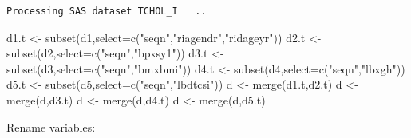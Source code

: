 \documentclass[
  letterpaper,
  DIV=11,
  numbers=noendperiod]{scrartcl}
\newenvironment{Shaded}{\begin{snugshade}}{\end{snugshade}}
\newcommand{\AttributeTok}[1]{\textcolor[rgb]{0.40,0.45,0.13}{#1}}
\newcommand{\CommentTok}[1]{\textcolor[rgb]{0.37,0.37,0.37}{#1}}
\newcommand{\FunctionTok}[1]{\textcolor[rgb]{0.28,0.35,0.67}{#1}}
\newcommand{\NormalTok}[1]{\textcolor[rgb]{0.00,0.23,0.31}{#1}}
\newcommand{\OtherTok}[1]{\textcolor[rgb]{0.00,0.23,0.31}{#1}}
\newcommand{\SpecialCharTok}[1]{\textcolor[rgb]{0.37,0.37,0.37}{#1}}
\newcommand{\StringTok}[1]{\textcolor[rgb]{0.13,0.47,0.30}{#1}}
\begin{document}
\begin{verbatim}
Processing SAS dataset TCHOL_I   ..
\end{verbatim}

\begin{Shaded}
\begin{Highlighting}[]
\NormalTok{d1.t }\OtherTok{\textless{}{-}} \FunctionTok{subset}\NormalTok{(d1,}\AttributeTok{select=}\FunctionTok{c}\NormalTok{(}\StringTok{"seqn"}\NormalTok{,}\StringTok{"riagendr"}\NormalTok{,}\StringTok{"ridageyr"}\NormalTok{))}
\NormalTok{d2.t }\OtherTok{\textless{}{-}} \FunctionTok{subset}\NormalTok{(d2,}\AttributeTok{select=}\FunctionTok{c}\NormalTok{(}\StringTok{"seqn"}\NormalTok{,}\StringTok{"bpxsy1"}\NormalTok{))}
\NormalTok{d3.t }\OtherTok{\textless{}{-}} \FunctionTok{subset}\NormalTok{(d3,}\AttributeTok{select=}\FunctionTok{c}\NormalTok{(}\StringTok{"seqn"}\NormalTok{,}\StringTok{"bmxbmi"}\NormalTok{))}
\NormalTok{d4.t }\OtherTok{\textless{}{-}} \FunctionTok{subset}\NormalTok{(d4,}\AttributeTok{select=}\FunctionTok{c}\NormalTok{(}\StringTok{"seqn"}\NormalTok{,}\StringTok{"lbxgh"}\NormalTok{))}
\NormalTok{d5.t }\OtherTok{\textless{}{-}} \FunctionTok{subset}\NormalTok{(d5,}\AttributeTok{select=}\FunctionTok{c}\NormalTok{(}\StringTok{"seqn"}\NormalTok{,}\StringTok{"lbdtcsi"}\NormalTok{))}
\NormalTok{d }\OtherTok{\textless{}{-}} \FunctionTok{merge}\NormalTok{(d1.t,d2.t)}
\NormalTok{d }\OtherTok{\textless{}{-}} \FunctionTok{merge}\NormalTok{(d,d3.t)}
\NormalTok{d }\OtherTok{\textless{}{-}} \FunctionTok{merge}\NormalTok{(d,d4.t)}
\NormalTok{d }\OtherTok{\textless{}{-}} \FunctionTok{merge}\NormalTok{(d,d5.t)}
\end{Highlighting}
\end{Shaded}

Rename variables:

\begin{Shaded}
\end{Shaded}
\end{document}
